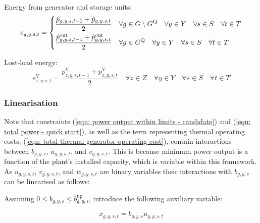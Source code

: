 \documentclass{article}
\newcommand{\sGenerators}{G}
\newcommand{\sStorage}{G^{\mathrm{Q}}}
\newcommand{\sYears}{Y}
\newcommand{\sScenarios}{S}
\newcommand{\sIntervals}{T}
\newcommand{\sZones}{Z}
\newcommand{\iGenerator}{g}
\newcommand{\iYear}{y}
\newcommand{\iScenario}{s}
\newcommand{\iInterval}{t}
\newcommand{\iZone}{z}
\newcommand{\vEnergy}[1][\iGenerator,\iYear,\iScenario,\iInterval]{e_{#1}}
\newcommand{\vStartupIndicator}[1][\iGenerator,\iYear,\iScenario,\iInterval]{v_{#1}}
\newcommand{\vShutdownIndicator}[1][\iGenerator,\iYear,\iScenario,\iInterval]{w_{#1}}
\newcommand{\vOnIndicator}[1][\iGenerator,\iYear,\iScenario,\iInterval]{u_{#1}}
\newcommand{\vPowerTotal}[1][\iGenerator,\iYear,\iScenario,\iInterval]{\hat{p}_{#1}}
\newcommand{\vPowerTotalOut}[1][\iGenerator,\iYear,\iScenario,\iInterval]{\hat{p}^{\mathrm{out}}_{#1}}
\newcommand{\vLostLoadEnergy}[1][\iZone,\iYear,\iScenario,\iInterval]{e^{\mathrm{V}}_{#1}}
\newcommand{\vLostLoadPower}[1][\iZone,\iYear,\iScenario,\iInterval]{p^{\mathrm{V}}_{#1}}
\newcommand{\vInstalledCapacityTotalScenario}[1][\iGenerator,\iYear,\iScenario]{b_{#1}}
\newcommand{\vInstalledCapacityOnStateAux}[1][\iGenerator,\iYear,\iScenario,\iInterval]{x_{#1}}
\begin{document}
Energy from generator and storage units:
\begin{equation}
\vEnergy = \begin{dcases}
\frac{\vPowerTotal[\iGenerator, \iYear,\iScenario,\iInterval-1] + \vPowerTotal}{2} & \forall \iGenerator \in \sGenerators \setminus \sStorage \quad \forall \iYear \in \sYears \quad \forall \iScenario \in \sScenarios \quad \forall \iInterval \in \sIntervals\\
\frac{\vPowerTotalOut[\iGenerator, \iYear,\iScenario,\iInterval-1] + \vPowerTotalOut}{2} & \forall \iGenerator \in \sStorage \quad \forall \iYear \in \sYears \quad \forall \iScenario \in \sScenarios \quad \forall \iInterval \in \sIntervals\\
\end{dcases}
\end{equation}

Lost-load energy:
\begin{equation}
\vLostLoadEnergy = \frac{\vLostLoadPower[\iZone, \iYear,\iScenario,\iInterval-1] + \vLostLoadPower}{2} \quad \forall \iZone \in \sZones \quad \forall \iYear \in \sYears \quad \forall \iScenario \in \sScenarios \quad \forall \iInterval \in \sIntervals
\label{eqn: lost-load energy constraint}
\end{equation}

\subsubsection{Linearisation}
Note that constraints (\ref{eqn: power output within limits - candidate}) and (\ref{eqn: total power - quick start}), as well as the term representing thermal operating costs, (\ref{eqn: total thermal generator operating cost}), contain interactions between $\vInstalledCapacityTotalScenario$, $\vOnIndicator$, and $\vStartupIndicator$. This is because minimum power output is a function of the plant's installed capacity, which is variable within this framework. As $\vOnIndicator$, $\vStartupIndicator$, and $\vShutdownIndicator$ are binary variables their interactions with $\vInstalledCapacityTotalScenario$ can be linearised as follows:

Assuming $0 \leq \vInstalledCapacityTotalScenario \leq \vInstalledCapacityTotalScenario^{\mathrm{up}}$, introduce the following auxiliary variable:

\begin{equation}
\vInstalledCapacityOnStateAux = \vInstalledCapacityTotalScenario \vOnIndicator
\end{equation}
\end{document}
